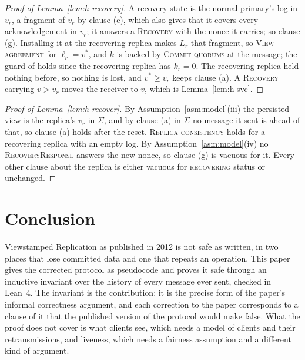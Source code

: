 \documentclass[11pt,a4paper]{article}
\theoremstyle{plain}
\theoremstyle{definition}
\theoremstyle{remark}
\newcommand{\msg}[1]{\textsc{#1}}
\newcommand{\recovering}{\textsc{recovering}}
\newcommand{\Local}{\textsc{Replica-consistency}}
\newcommand{\OneLog}{\textsc{View-agreement}}
\newcommand{\CommitsBacked}{\textsc{Commit-quorums}}
\begin{document}
\begin{proof}[Proof of Lemma~\ref{lem:h-recovery}]
A recovery state is the normal primary's log in $v_r$, a fragment of
$v_r$ by clause (e), which also gives that it covers every
acknowledgement in $v_r$; it answers a \msg{Recovery} with the nonce it
carries; so clause (g). Installing it at the recovering replica makes
$L_r$ that fragment, so \OneLog{} for $\ell_r = v^*$, and $k$ is backed
by \CommitsBacked{} at the message; the guard of 
holds since the recovering replica has $k_r = 0$. The recovering replica
held nothing before, so nothing is lost, and $v^* \ge v_r$ keeps clause
(a). A \msg{Recovery} carrying $v > v_r$ moves the receiver to $v$,
which is Lemma~\ref{lem:h-svc}.
\end{proof}

\begin{proof}[Proof of Lemma~\ref{lem:h-recover}]
By Assumption~\ref{asm:model}(iii) the persisted view is the replica's
$v_r$ in $\Sigma$, and by clause (a) in $\Sigma$ no message it sent is
ahead of that, so clause (a) holds after the reset. \Local{} holds for a
recovering replica with an empty log. By Assumption~\ref{asm:model}(iv)
no \msg{RecoveryResponse} answers the new nonce, so clause (g) is
vacuous for it. Every other clause about the replica is either vacuous
for \recovering{} status or unchanged.
\end{proof}

\section{Conclusion}
\label{sec:conclusion}

Viewstamped Replication as published in 2012 is not safe as written, in
two places that lose committed data and one that repeats an operation.
This paper gives the corrected protocol as pseudocode and proves it safe
through an inductive invariant over the history of every message ever
sent, checked in Lean~4. The invariant is the contribution: it is the
precise form of the paper's informal correctness argument, and each
correction to the paper corresponds to a clause of it that the published
version of the protocol would make false. What the proof does not cover
is what clients see, which needs a model of clients and their
retransmissions, and liveness, which needs a fairness assumption and a
different kind of argument.
\end{document}
